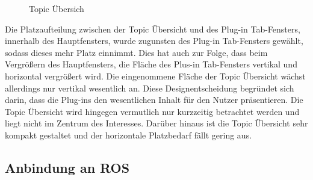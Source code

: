 \begin{figure}[t]
  \begin{center}
  \end{center}
  \caption{Topic Übersich}
  \label{fig:topics}
\end{figure}

Die Platzaufteilung zwischen der Topic Übersicht und des Plug-in Tab-Fensters,
innerhalb des Hauptfensters, wurde zugunsten des Plug-in Tab-Fensters gewählt,
sodass dieses mehr Platz einnimmt.  Dies hat auch zur Folge, dass beim Vergrößern
des Hauptfensters, die Fläche des Plus-in Tab-Fensters vertikal und horizontal
vergrößert wird. Die eingenommene Fläche der Topic Übersicht wächst allerdings
nur vertikal wesentlich an. Diese Designentscheidung begründet sich darin,
dass die Plug-ins den wesentlichen Inhalt für den Nutzer präsentieren. Die
Topic Übersicht wird hingegen vermutlich nur kurzzeitig betrachtet werden und
liegt nicht im Zentrum des Interesses. Darüber hinaus ist die Topic Übersicht
sehr kompakt gestaltet und der horizontale Platzbedarf fällt gering aus.


\subsection{Anbindung an ROS}

